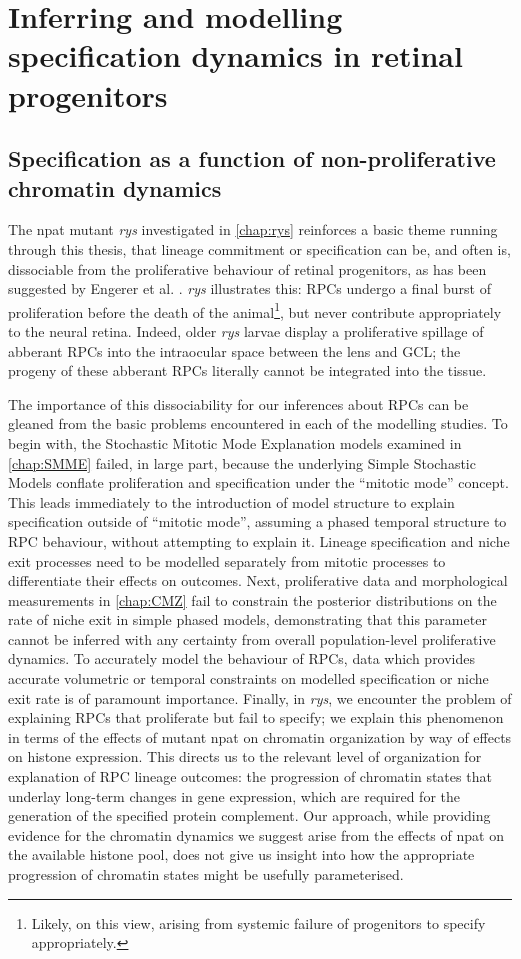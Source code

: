 \chapter{Inferring and modelling specification dynamics in retinal progenitors}
\label{chap:rysoutro}

\section{Specification as a function of non-proliferative chromatin dynamics}
The npat mutant \textit{rys} investigated in \autoref{chap:rys} reinforces a basic theme running through this thesis, that lineage commitment or specification can be, and often is, dissociable from the proliferative behaviour of retinal progenitors, as has been suggested by Engerer et al. \cite{Engerer2017}. \textit{rys} illustrates this: RPCs undergo a final burst of proliferation before the death of the animal\footnote{Likely, on this view, arising from systemic failure of progenitors to specify appropriately.}, but never contribute appropriately to the neural retina. Indeed, older \textit{rys} larvae display a proliferative spillage of abberant RPCs into the intraocular space between the lens and GCL; the progeny of these abberant RPCs literally cannot be integrated into the tissue.

The importance of this dissociability for our inferences about RPCs can be gleaned from the basic problems encountered in each of the modelling studies. To begin with, the Stochastic Mitotic Mode Explanation models examined in \autoref{chap:SMME} failed, in large part, because the underlying Simple Stochastic Models conflate proliferation and specification under the ``mitotic mode'' concept. This leads immediately to the introduction of model structure to explain specification outside of ``mitotic mode'', assuming a phased temporal structure to RPC behaviour, without attempting to explain it. Lineage specification and niche exit processes need to be modelled separately from mitotic processes to differentiate their effects on outcomes. Next, proliferative data and morphological measurements in \autoref{chap:CMZ} fail to constrain the posterior distributions on the rate of niche exit in simple phased models, demonstrating that this parameter cannot be inferred with any certainty from overall population-level proliferative dynamics. To accurately model the behaviour of RPCs, data which provides accurate volumetric or temporal constraints on modelled specification or niche exit rate is of paramount importance. Finally, in \textit{rys}, we encounter the problem of explaining RPCs that proliferate but fail to specify; we explain this phenomenon in terms of the effects of mutant npat on chromatin organization by way of effects on histone expression. This directs us to the relevant level of organization for explanation of RPC lineage outcomes: the progression of chromatin states that underlay long-term changes in gene expression, which are required for the generation of the specified protein complement. Our  approach, while providing evidence for the chromatin dynamics we suggest arise from the effects of npat on the available histone pool, does not give us insight into how the appropriate progression of chromatin states might be usefully parameterised.

